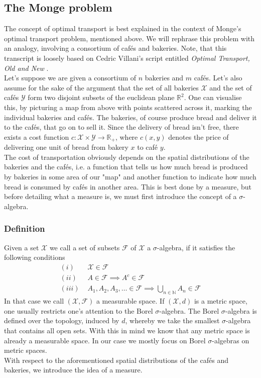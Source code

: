 \documentclass[11pt,a4paper]{article}
\begin{document}
\subsection{The Monge problem}
The concept of optimal transport is best explained in the context of Monge's optimal transport problem, mentioned above. We will rephrase this problem with an analogy, involving a consortium of cafés and bakeries. Note, that this transcript is loosely based on Cedric Villani's script entitled {\sl Optimal Transport, Old and New} \cite{Villani}.\vspace{1em}\\
Let's suppose we are given a consortium of $n$ bakeries and $m$ cafés. Let's also assume for the sake of the argument that the set of all bakeries $\mathcal{X}$ and the set of cafés $\mathcal{Y}$ form two disjoint subsets of the euclidean plane $\mathbb{R}^2$. One can visualise this, by picturing a map from above with points scattered across it, marking the individual bakeries and cafés. The bakeries, of course produce bread and deliver it to the cafés, that go on to sell it. Since the delivery of bread isn't free, there exists a cost function $c:\mathcal{X\times{}Y}\rightarrow\mathbb{R}_{+}$, where $c(x,y)$ denotes the price of delivering one unit of bread from bakery $x$ to café $y$. \vspace{1em}\\
The cost of transportation obviously depends on the spatial distributions of the bakeries and the cafés, i.e. a function that tells us how much bread is produced by bakeries in some area of our "map" and another function to indicate how much bread is consumed by cafés in another area. This is best done by a measure, but before detailing what a measure is, we must first introduce the concept of a $\sigma$-algebra.
\subsubsection{Definition}
Given a set $\mathcal{X}$ we call a set of subsets $\mathcal{F}$ of $\mathcal{X}$ a $\sigma$-algebra, if it satisfies the following conditions \vspace{0.25em}
\begin{align*}
(i)&\,\,\mathcal{X}\in\mathcal{F} \\[6pt](ii)&\,\,A\in\mathcal{F}\implies A^c\in\mathcal{F} \\[3pt](iii)&\,\,A_1,A_2,A_3,\ldots\in\mathcal{F}\implies\bigcup\limits_{n\in\mathbb{N}}A_n\in\mathcal{F}
\end{align*}
In that case we call $(\mathcal{X},\mathcal{F})$ a measurable space.
If $(\mathcal{X},d)$ is a metric space, one usually restricts one's attention to the Borel $\sigma$-algebra. The Borel $\sigma$-algebra is defined over the topology, induced by $d$, whereby we take the smallest $\sigma$-algebra that contains all open sets. With this in mind we know that any metric space is already a measurable space. In our case we mostly focus on Borel $\sigma$-algebras on metric spaces.\vspace{2em}\\
With respect to the aforementioned spatial distributions of the cafés and bakeries, we introduce the idea of a measure. 
\end{document}
